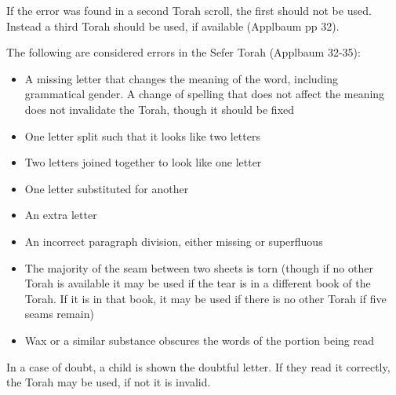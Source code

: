 \documentclass[11pt]{article}
\begin{document}
If the error was found in a second Torah scroll, the first should not be used.  Instead a third Torah should be used, if available (Applbaum pp 32).

The following are considered errors in the Sefer Torah (Applbaum 32-35):
\begin{itemize}
	\item A missing letter that changes the meaning of the word, including grammatical gender. A change of spelling that does not affect the meaning does not invalidate the Torah, though it should be fixed
	\item One letter split such that it looks like two letters
	\item Two letters joined together to look like one letter
	\item One letter substituted for another
	\item An extra letter
	\item An incorrect paragraph division, either missing or superfluous
	\item The majority of the seam between two sheets is torn (though if no other Torah is available it may be used if the tear is in a different book of the Torah.  If it is in that book, it may be used if there is no other Torah if five seams remain)
	\item Wax or a similar substance obscures the words of the portion being read
\end{itemize}

In a case of doubt, a child is shown the doubtful letter.  If they read it correctly, the Torah may be used, if not it is invalid.
\end{document}
